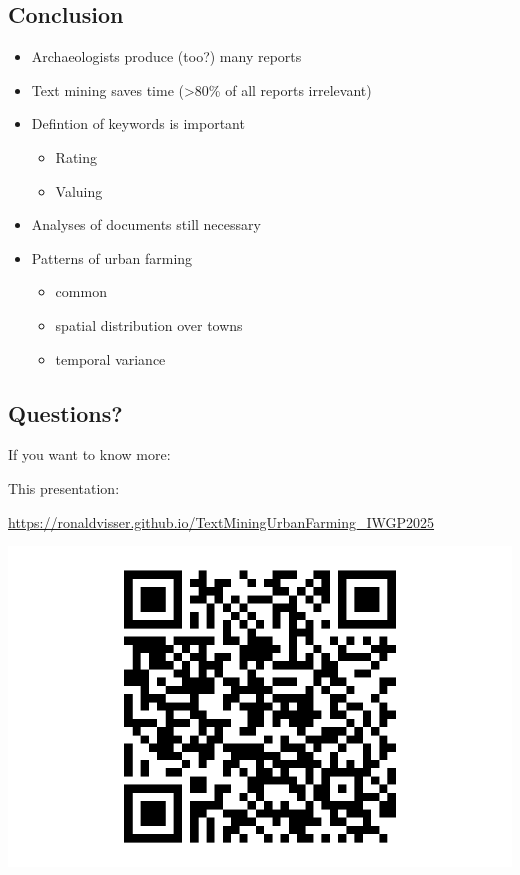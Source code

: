 \documentclass[
  letterpaper,
  DIV=11,
  numbers=noendperiod]{scrartcl}
\providecommand{\tightlist}{%
  \setlength{\itemsep}{0pt}\setlength{\parskip}{0pt}}\usepackage{longtable,booktabs,array}
\begin{document}
\hypertarget{conclusion}{%
\subsection{Conclusion}\label{conclusion}}

\begin{itemize}
\tightlist
\item
  Archaeologists produce (too?) many reports
\item
  Text mining saves time (\textgreater80\% of all reports irrelevant)
\item
  Defintion of keywords is important

  \begin{itemize}
  \tightlist
  \item
    Rating
  \item
    Valuing
  \end{itemize}
\item
  Analyses of documents still necessary
\end{itemize}

\begin{itemize}
\tightlist
\item
  Patterns of urban farming

  \begin{itemize}
  \tightlist
  \item
    common
  \item
    spatial distribution over towns
  \item
    temporal variance
  \end{itemize}
\end{itemize}

\hypertarget{questions}{%
\subsection{Questions?}\label{questions}}

If you want to know more:

This presentation:

\url{https://ronaldvisser.github.io/TextMiningUrbanFarming_IWGP2025}

\includegraphics{index_files/figure-pdf/unnamed-chunk-2-1.pdf}
\end{document}
